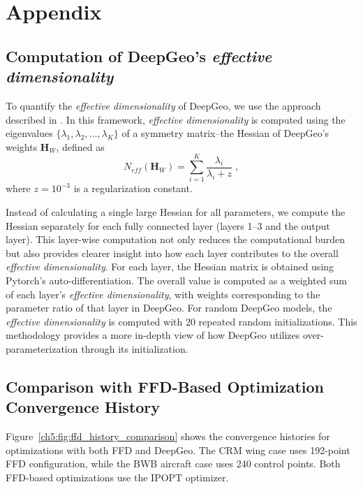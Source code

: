 \section{Appendix}

\subsection{Computation of DeepGeo's \textit{effective dimensionality}}
\label{ch5:sec:appendix_effe_dim}

To quantify the \textit{effective dimensionality} of DeepGeo, we use the approach described in \citet{ai.Maddox2020}. In this framework, \textit{effective dimensionality} is computed using the eigenvalues $\{\lambda_1,\lambda_2,...,\lambda_K\}$ of a symmetry matrix--the Hessian of DeepGeo's weights $\textbf{H}_W$, defined as
\begin{equation}
    N_{eff}(\textbf{H}_W) = \sum_{i=1}^K \frac{\lambda_i}{\lambda_i+z}\;,
    \label{ch5:eq:response_effective_dimensionality}
\end{equation}
where $z=10^{-3}$ is a regularization constant. 

Instead of calculating a single large Hessian for all parameters, we compute the Hessian separately for each fully connected layer (layers 1–3 and the output layer). This layer-wise computation not only reduces the computational burden but also provides clearer insight into how each layer contributes to the overall \textit{effective dimensionality}.
For each layer, the Hessian matrix is obtained using Pytorch's auto-differentiation. The overall value is computed as a weighted sum of each layer's \textit{effective dimensionality}, with weights corresponding to the parameter ratio of that layer in DeepGeo. For random DeepGeo models, the \textit{effective dimensionality} is computed with 20 repeated random initializations. This methodology provides a more in-depth view of how DeepGeo utilizes over-parameterization through its initialization.



\subsection{Comparison with FFD-Based Optimization Convergence History}
\label{ch5:sec:appendix_optim_history}

Figure~\ref{ch5:fig:ffd_history_comparison} shows the convergence histories for optimizations with both FFD and DeepGeo. The CRM wing case uses 192-point FFD configuration, while the BWB aircraft case uses 240 control points. Both FFD-based optimizations use the IPOPT optimizer.

